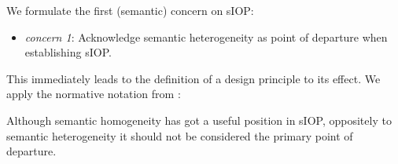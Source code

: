 \documentclass[sort&compress,preprint,authoryear,3p,twocolumn]{elsarticle}
\providecommand{\tightlist}{%
  \setlength{\itemsep}{0pt}\setlength{\parskip}{0pt}}
\begin{document}
We formulate the first (semantic) concern on sIOP:

\begin{itemize}
\tightlist
\item
  \emph{concern 1}: Acknowledge semantic heterogeneity as point of
  departure when establishing sIOP.
\end{itemize}

This immediately leads to the definition of a design principle to its
effect. We apply the normative notation from \citep{Greefhorst2011}:

\begin{mmdp}\label{dp:shf}

Although semantic homogeneity has got a useful position in sIOP, oppositely to semantic heterogeneity it should not be considered the primary point of departure.


\end{mmdp}
\end{document}
